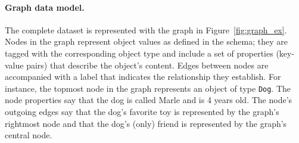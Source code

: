 



\paragraph{Graph data model.}

The complete \goodbois dataset is represented with the graph in
Figure~\ref{fig:graph_ex}. Nodes in the graph represent object values
as defined in the schema; they are tagged with the corresponding
object type and include a set of properties (key-value pairs) that
describe the object's content. Edges between nodes are accompanied with
a label that indicates the relationship they establish. For instance,
the topmost node in the graph represents an object of type
\texttt{Dog}. The node properties say that the dog is called
Marle and is 4 years old. The node's outgoing edges say that the dog's
favorite toy is represented by the graph's rightmost node and that the dog's
(only) friend is represented by the graph's central node.

